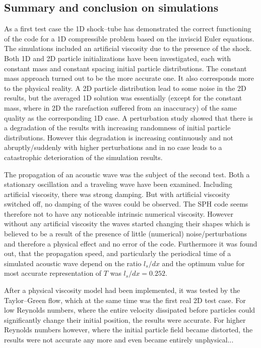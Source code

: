 \documentclass{report}
\begin{document}
\subsection{Summary and conclusion on simulations}
As a first test case the 1D shock--tube has demonstrated the correct functioning of the code for a 1D compressible problem based on the inviscid Euler equations. The simulations included an artificial viscosity due to the presence of the shock. Both 1D and 2D particle initializations have been investigated, each with constant mass and constant spacing initial particle distributions. The constant mass approach turned out to be the more accurate one. It also corresponds more to the physical reality. A 2D particle distribution lead to some noise in the 2D results, but the averaged 1D solution was essentially (except for the constant mass, where in 2D the rarefaction suffered from an inaccuracy) of the same quality as the corresponding 1D case. A perturbation study showed that there is a degradation of the results with increasing randomness of initial particle distributions. However this degradation is increasing continuously and not abruptly/suddenly with higher perturbations and in no case leads to a catastrophic deterioration of the simulation results.

The propagation of an acoustic wave was the subject of the second test. Both a stationary oscillation and a traveling wave have been examined. Including artificial viscosity, there was strong damping. But with artificial viscosity switched off, no damping of the waves could be observed. The SPH code seems therefore not to have any noticeable intrinsic numerical viscosity. However without any artificial viscosity the waves started changing their shapes which is believed to be a result of the presence of little (numerical) noise/perturbations and therefore a physical effect and no error of the code. Furthermore it was found out, that the propagation speed, and particularly the periodical time of a simulated acoustic wave depend on the ratio $l_s/dx$ and the optimum value for most accurate representation of $T$ was $l_s/dx=0.252$. %

After a physical viscosity model had been implemented, it was tested by the Taylor--Green flow, which at the same time was the first real 2D %
test case. For low Reynolds numbers, where the entire velocity dissipated before particles could significantly change their initial position, the results were accurate. For higher Reynolds numbers however, where the initial particle field became distorted, the results were not accurate any more and even became entirely unphysical...
\end{document}
